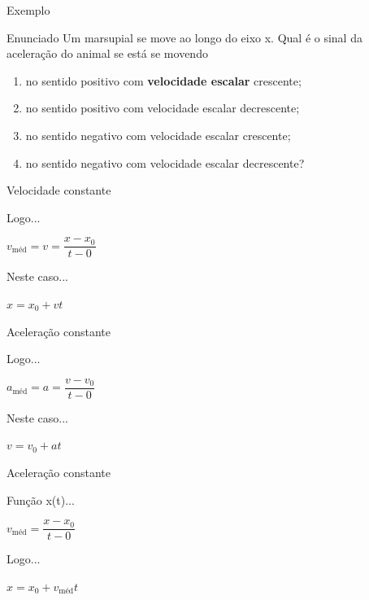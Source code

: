 \documentclass[xcolor=dvipsnames,table]{beamer}
\begin{document}
	\begin{frame}{Exemplo}
		\begin{block}{Enunciado}
			Um marsupial se move ao longo do eixo x. Qual é o sinal da aceleração do animal se está se movendo 
			\begin{enumerate}
				\item no sentido positivo com {\bf velocidade escalar} crescente;
				\item no sentido positivo com velocidade escalar decrescente;
				\item no sentido negativo com velocidade escalar
				crescente;
				\item no sentido negativo com velocidade escalar decrescente?
			\end{enumerate}   
		\end{block}
	\end{frame}
	
	\begin{frame}{Velocidade constante}
		\begin{block}{Logo...}
			\begin{center}
				$v_{\mbox{méd}} = v = \dfrac{x - x_0}{t-0}$
			\end{center}
		\end{block} 
		\begin{block}{Neste caso...}
			\begin{center}
				$x = x_0 + vt$
			\end{center}
		\end{block}
	\end{frame}
	
	\begin{frame}{Aceleração constante}
		\begin{block}{Logo...}
			\begin{center}
				$a_{\mbox{méd}} = a = \dfrac{v - v_0}{t-0}$
			\end{center} 
		Neste caso...
			\begin{center}
				$v = v_0 + at$
			\end{center}
		\end{block} 
	\end{frame}

	\begin{frame}{Aceleração constante}
		\begin{block}{Função x(t)...}
			\begin{center}
				$v_{\mbox{méd}} = \dfrac{x - x_0}{t-0}$
			\end{center}
			Logo...
			\begin{center}
				$x = x_0 + v_{\mbox{méd}}t$
			\end{center}
		\end{block} 
	\end{frame}
\end{document}
